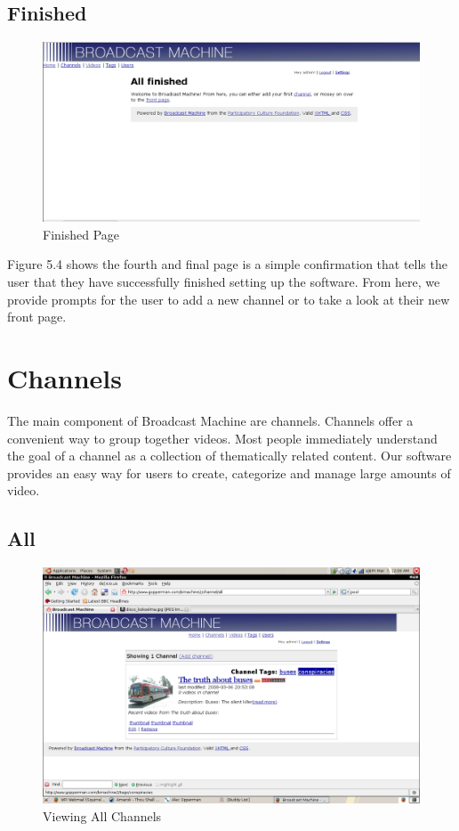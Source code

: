 \documentclass[a4paper,12pt]{report}
\begin{document}
\subsection{Finished}
\begin{figure}[htp]
\begin{center}
\includegraphics[width=150mm]{./images/setup4.png}
\caption{Finished Page}
\end{center}
\end{figure}

Figure 5.4 shows the fourth and final page is a simple confirmation that tells the user that they have successfully finished setting up the software.
From here, we provide prompts for the user to add a new channel or to take a look at their new front page.

\section{Channels}
The main component of Broadcast Machine are channels.
Channels offer a convenient way to group together videos.
Most people immediately understand the goal of a channel as a collection of thematically related content.
Our software provides an easy way for users to create, categorize and manage large amounts of video.

\subsection{All}
\begin{figure}[htp]
\begin{center}
\includegraphics[width=150mm]{./images/channelall.png}
\end{center}
\caption{Viewing All Channels}
\end{figure}
\end{document}
